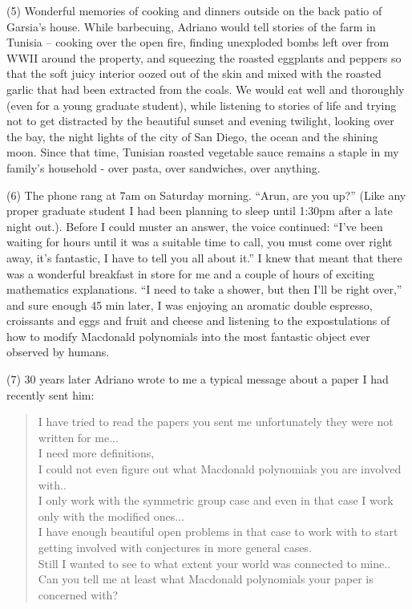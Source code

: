 \documentclass{notices}
\begin{document}
(5) Wonderful memories of cooking and dinners
outside on the back patio of Garsia's house.  
While barbecuing, Adriano would tell stories of the farm in Tunisia --
cooking over the open fire,
finding unexploded bombs left over from  WWII around the property,
and squeezing the roasted eggplants and peppers
so that the soft juicy interior  oozed out of the skin and
mixed with the  roasted garlic that had been extracted from the coals.  
We would eat well and  thoroughly
(even for a young graduate student),
while listening to stories of life and
trying not to get distracted by the beautiful sunset
and evening twilight, looking over the bay,
the night lights of the city of San Diego,
the ocean and the shining moon.
Since that time, Tunisian roasted vegetable sauce remains
a staple in my family's household - over pasta, over sandwiches, over anything.

(6) The phone rang at 7am on Saturday morning.  ``Arun, are you up?''
(Like any proper graduate student
I had been planning to sleep until 1:30pm after a late night out.).
Before I could muster an answer, the voice continued:
``I've been waiting for hours until it was a suitable time to call,  
you must come over right away, it's fantastic, I have to tell you all about it.''
I knew that meant that there was a wonderful breakfast in store for me
and a couple of hours of exciting mathematics explanations.  
``I need to take a shower, but then I'll be right over,''
and sure enough 45 min later,
I was enjoying an aromatic double espresso, croissants and eggs and fruit and cheese
and listening to the expostulations of how to modify Macdonald polynomials
into the most fantastic object ever observed by humans.

(7) 30 years later Adriano wrote to me a typical message about a paper I had recently sent him:
\begin{quote}
I have tried to read the papers you sent me
unfortunately they were not written for me...\\
I need more definitions,\\
I could not even figure out what Macdonald polynomials you are involved with..\\
I only work with the symmetric group case and
even in that case
I work only with the modified ones...\\
I have enough beautiful open problems in that case to work with
to start getting involved with conjectures in more general cases.\\
Still I wanted to see to what extent your world was connected to mine..\\
Can you tell me at least what Macdonald polynomials your paper is concerned with?
\end{quote}
\end{document}
